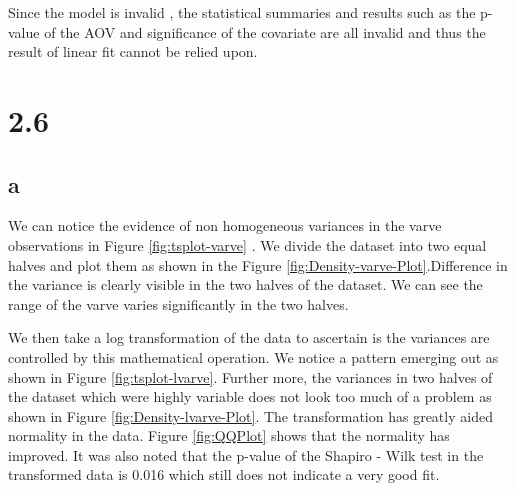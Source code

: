 \documentclass{article}
\begin{document}
Since the model is invalid , the statistical summaries and results such as the p-value of the AOV and significance of the covariate are all invalid and thus the result of linear fit cannot be relied upon.

\newpage

\section{2.6}

\subsection{a}

We can notice the evidence of non homogeneous variances in the varve observations in Figure \ref{fig:tsplot-varve} . We divide the dataset into two equal halves and plot them as shown in the Figure \ref{fig:Density-varve-Plot}.Difference in the variance 
is clearly visible in the two halves of the dataset. We can see the range of the varve varies significantly in the two halves. 

We then take a log transformation of the data to ascertain is the variances are controlled by this mathematical operation.
We notice a pattern emerging out as shown in Figure \ref{fig:tsplot-lvarve}. Further more, the variances in two halves of the 
dataset which were highly variable does not look too much of a problem as shown in Figure \ref{fig:Density-lvarve-Plot}. 
The transformation has greatly aided normality in the data. Figure \ref{fig:QQPlot} shows that the normality has improved. 
It was also noted that the p-value of the Shapiro - Wilk test in the transformed data is 0.016 which still does not indicate a very good fit.
\end{document}
